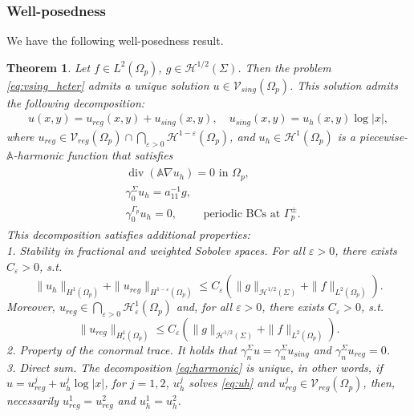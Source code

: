 \documentclass[report]{elsarticle}
\newtheorem{theorem}{Theorem}[section]
\numberwithin{theorem}{section}
\newcommand{\re}{\varepsilon}
\begin{document}
\subsubsection{Well-posedness}
\label{sec:wp_irreg}
We have the following well-posedness result. 
\begin{theorem}
	\label{theorem:reg_well_posedness}
	Let $f\in L^2(\Omega_p)$, $g\in \mathcal{H}^{1/2}(\Sigma)$. Then the problem \eqref{eq:vsing_heter} admits a unique solution $u\in \mathcal{V}_{sing}(\Omega_p)$. This solution admits the following decomposition:
	\begin{align}
		\label{eq:harmonic}
		u(x,y)={u}_{reg}(x,y)+u_{sing}(x,y), \quad u_{sing}(x,y)=u_h(x,y)\log|x|,
	\end{align}
	where ${u}_{reg}\in \mathcal{V}_{reg}(\Omega_p)\cap \bigcap\limits_{\varepsilon>0}\mathcal{H}^{1-\varepsilon}(\Omega_p)$, and $u_h\in \mathcal{H}^1(\Omega_p)$ is a piecewise-$\mathbb{A}$-harmonic function that satisfies
	\begin{align}
		\label{eq:uh}
		\begin{split}
			&\operatorname{div}(\mathbb{A}\nabla u_h)=0 \text{ in }\Omega_p, \\ &\gamma_{0}^{\Sigma}u_h = a_{11}^{-1}g, \\			
			&\gamma_0^{\Gamma_p}u_h =0, \qquad \text{ periodic BCs at }\Gamma^{\pm}_p.
		\end{split}
	\end{align} 	 
	This decomposition satisfies additional properties: \\
	{1. Stability in fractional and weighted Sobolev spaces. }For all $\re>0$, there exists $C_{\re}>0$, s.t. $$\|u_h\|_{H^1(\Omega_p)}+ \|u_{reg}\|_{H^{1-\varepsilon}(\Omega_p)}\leq C_{\varepsilon}\left( \|g\|_{\mathcal{H}^{1/2}(\Sigma)}+\|f\|_{L^2(\Omega_p)}\right).$$
	Moreover, $u_{reg}\in\bigcap\limits_{\varepsilon>0}\mathcal{H}^1_{\varepsilon}(\Omega_p)$ and, for all $\varepsilon>0$, there exists $C_{\varepsilon}>0$, s.t.  $$\|u_{reg}\|_{H^{1}_{\varepsilon}(\Omega_p)}\leq C_{\varepsilon}\left( \|g\|_{\mathcal{H}^{1/2}(\Sigma)}+\|f\|_{L^2(\Omega_p)}\right).$$ 
	{2. Property of the conormal trace.}	 It holds that $\gamma_n^{\Sigma}u=\gamma_n^{\Sigma}u_{sing}$ and $\gamma_n^{\Sigma}u_{reg}=0$.\\
	{3. Direct sum.} The decomposition \eqref{eq:harmonic} is unique, in other words, if $u=u_{reg}^j+u_h^j\log|x|$, for $j=1,2$, $u_h^j$ solves \eqref{eq:uh} and $u_{reg}^j\in \mathcal{V}_{reg}(\Omega_p)$, then, necessarily $u_{reg}^1=u_{reg}^2$ and $u_h^1=u_h^2$. 
\end{theorem}
\end{document}
